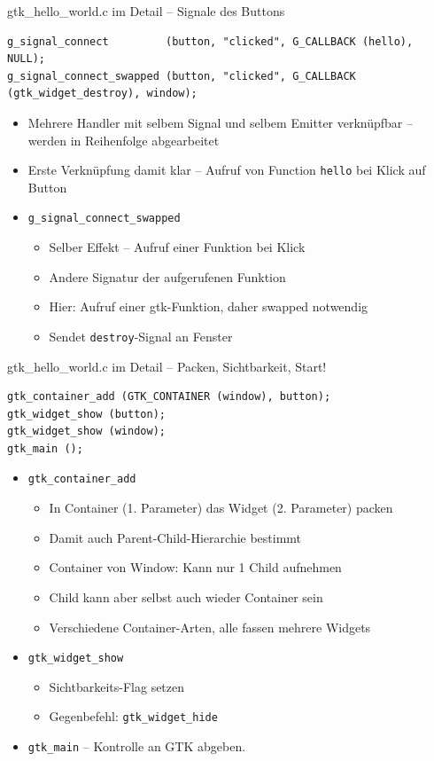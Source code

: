 \begin{frame}[fragile]{gtk\_hello\_world.c im Detail -- Signale des Buttons}
%
\begin{verbatim}
g_signal_connect         (button, "clicked", G_CALLBACK (hello), NULL);
g_signal_connect_swapped (button, "clicked", G_CALLBACK (gtk_widget_destroy), window);
\end{verbatim}
%
\begin{itemize}
\item Mehrere Handler mit selbem Signal und selbem Emitter verknüpfbar -- werden in Reihenfolge abgearbeitet
\item Erste Verknüpfung damit klar -- Aufruf von Function \texttt{hello} bei Klick auf Button
\item \texttt{g\_signal\_connect\_swapped}
	\begin{itemize}
	\item Selber Effekt -- Aufruf einer Funktion bei Klick
	\item Andere Signatur der aufgerufenen Funktion
	\item Hier: Aufruf einer gtk-Funktion, daher swapped notwendig
	\item Sendet \texttt{destroy}-Signal an Fenster
	\end{itemize}
\end{itemize}
%
\end{frame}


\begin{frame}[fragile]{gtk\_hello\_world.c im Detail -- Packen, Sichtbarkeit, Start!}
%
\begin{verbatim}
gtk_container_add (GTK_CONTAINER (window), button);
gtk_widget_show (button);
gtk_widget_show (window);
gtk_main ();
\end{verbatim}
%
\begin{itemize}
\item \texttt{gtk\_container\_add}
	\begin{itemize}
	\item In Container (1. Parameter) das Widget (2. Parameter) packen
	\item Damit auch Parent-Child-Hierarchie bestimmt
	\item Container von Window: Kann nur 1 Child aufnehmen
	\item Child kann aber selbst auch wieder Container sein
	\item Verschiedene Container-Arten, alle fassen mehrere Widgets
	\end{itemize}
\item \texttt{gtk\_widget\_show}
	\begin{itemize}
	\item Sichtbarkeits-Flag setzen
	\item Gegenbefehl: \texttt{gtk\_widget\_hide}
	\end{itemize}
\item \texttt{gtk\_main} -- Kontrolle an GTK abgeben.
\end{itemize}
%
\end{frame}

